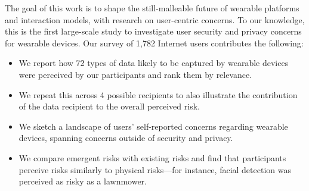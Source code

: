 The goal of this work is to shape the still-malleable future of wearable platforms and interaction models, with research on user-centric concerns. To our knowledge, this is the first large-scale study to investigate user security and privacy concerns for wearable devices. Our survey of 1,782 Internet users contributes the following: %

\begin{itemize} \itemsep1pt \parskip0pt 
\item We report how 72 types of data likely to be captured by wearable devices were perceived by our participants and rank them by relevance. 
\item We repeat this across 4 possible recipients to also illustrate the contribution of the data recipient to the overall perceived risk. 
\item We sketch a landscape of users' self-reported concerns regarding wearable devices, spanning concerns outside of security and privacy. 
\item We compare emergent risks with existing risks and find that participants perceive risks similarly to physical risks---for instance, facial detection was perceived as risky as a lawnmower.
\end{itemize}
